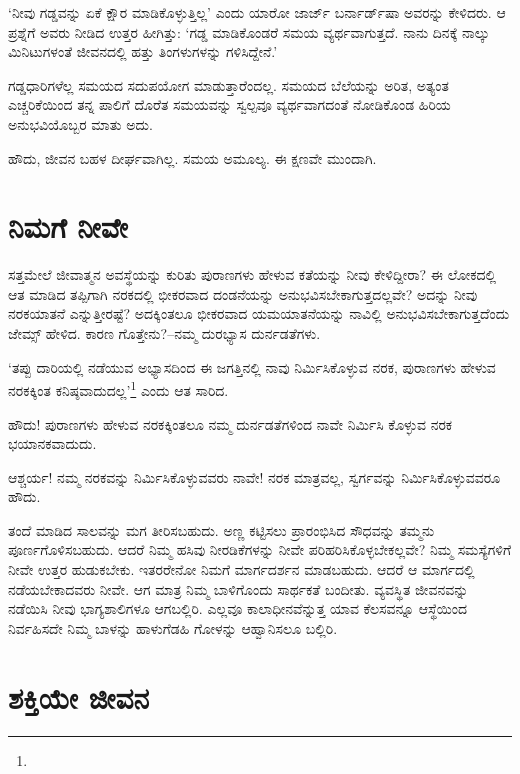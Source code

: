 ‘ನೀವು ಗಡ್ಡವನ್ನು ಏಕೆ ಕ್ಷೌರ ಮಾಡಿಕೊಳ್ಳುತ್ತಿಲ್ಲ’ ಎಂದು ಯಾರೋ ಜಾರ್ಜ್ ಬರ್ನಾರ್ಡ್‍ಷಾ ಅವರನ್ನು ಕೇಳಿದರು. ಆ ಪ್ರಶ್ನೆಗೆ ಅವರು ನೀಡಿದ ಉತ್ತರ ಹೀಗಿತ್ತು: ‘ಗಡ್ಡ ಮಾಡಿಕೊಂಡರೆ ಸಮಯ ವ್ಯರ್ಥವಾಗುತ್ತದೆ. ನಾನು ದಿನಕ್ಕೆ ನಾಲ್ಕು ಮಿನಿಟುಗಳಂತೆ ಜೀವನದಲ್ಲಿ ಹತ್ತು ತಿಂಗಳುಗಳನ್ನು ಗಳಿಸಿದ್ದೇನೆ.’

ಗಡ್ಡಧಾರಿಗಳೆಲ್ಲ ಸಮಯದ ಸದುಪಯೋಗ ಮಾಡುತ್ತಾರೆಂದಲ್ಲ. ಸಮಯದ ಬೆಲೆಯನ್ನು ಅರಿತ, ಅತ್ಯಂತ ಎಚ್ಚರಿಕೆಯಿಂದ ತನ್ನ ಪಾಲಿಗೆ ದೊರೆತ ಸಮಯವನ್ನು ಸ್ವಲ್ಪವೂ ವ್ಯರ್ಥವಾಗದಂತೆ ನೋಡಿಕೊಂಡ ಹಿರಿಯ ಅನುಭವಿಯೊಬ್ಬರ ಮಾತು ಅದು.

ಹೌದು, ಜೀವನ ಬಹಳ ದೀರ್ಘವಾಗಿಲ್ಲ. ಸಮಯ ಅಮೂಲ್ಯ. ಈ ಕ್ಷಣವೇ ಮುಂದಾಗಿ.


\section*{ನಿಮಗೆ ನೀವೇ}


ಸತ್ತಮೇಲೆ ಜೀವಾತ್ಮನ ಅವಸ್ಥೆಯನ್ನು ಕುರಿತು ಪುರಾಣಗಳು ಹೇಳುವ ಕತೆಯನ್ನು ನೀವು ಕೇಳಿ\-ದ್ದೀರಾ? ಈ ಲೋಕದಲ್ಲಿ ಆತ ಮಾಡಿದ ತಪ್ಪಿಗಾಗಿ ನರಕದಲ್ಲಿ ಭೀಕರವಾದ ದಂಡನೆಯನ್ನು ಅನುಭವಿಸಬೇಕಾಗುತ್ತದಲ್ಲವೇ? ಅದನ್ನು ನೀವು ನರಕಯಾತನೆ ಎನ್ನುತ್ತೀರಷ್ಟೆ? ಅದಕ್ಕಿಂತಲೂ ಭೀಕರವಾದ ಯಮಯಾತನೆಯನ್ನು ನಾವಿಲ್ಲಿ ಅನುಭವಿಸಬೇಕಾಗುತ್ತದೆಂದು ಜೇಮ್ಸ್​ ಹೇಳಿದ. ಕಾರಣ ಗೊತ್ತೇನು?–ನಮ್ಮ ದುರಭ್ಯಾಸ ದುರ್ನಡತೆಗಳು.

‘ತಪ್ಪು ದಾರಿಯಲ್ಲಿ ನಡೆಯುವ ಅಭ್ಯಾಸದಿಂದ ಈ ಜಗತ್ತಿನಲ್ಲಿ ನಾವು ನಿರ್ಮಿಸಿಕೊಳ್ಳುವ ನರಕ, ಪುರಾಣಗಳು ಹೇಳುವ ನರಕಕ್ಕಿಂತ ಕನಿಷ್ಠವಾದುದಲ್ಲ’\footnote{\hfill\hbox{}} ಎಂದು ಆತ ಸಾರಿದ.

ಹೌದು! ಪುರಾಣಗಳು ಹೇಳುವ ನರಕಕ್ಕಿಂತಲೂ ನಮ್ಮ ದುರ್ನಡತೆಗಳಿಂದ ನಾವೇ ನಿರ್ಮಿಸಿ ಕೊಳ್ಳುವ ನರಕ ಭಯಾನಕವಾದುದು.

ಆಶ್ಚರ್ಯ! ನಮ್ಮ ನರಕವನ್ನು ನಿರ್ಮಿಸಿಕೊಳ್ಳುವವರು ನಾವೇ! ನರಕ ಮಾತ್ರವಲ್ಲ, ಸ್ವರ್ಗವನ್ನು ನಿರ್ಮಿಸಿಕೊಳ್ಳುವವರೂ ಹೌದು.

ತಂದೆ ಮಾಡಿದ ಸಾಲವನ್ನು ಮಗ ತೀರಿಸಬಹುದು. ಅಣ್ಣ ಕಟ್ಟಿಸಲು ಪ್ರಾರಂಭಿಸಿದ ಸೌಧವನ್ನು ತಮ್ಮನು ಪೂರ್ಣಗೊಳಿಸಬಹುದು. ಆದರೆ ನಿಮ್ಮ ಹಸಿವು ನೀರಡಿಕೆಗಳನ್ನು ನೀವೇ ಪರಿಹರಿಸಿಕೊಳ್ಳಬೇಕಲ್ಲವೇ? ನಿಮ್ಮ ಸಮಸ್ಯೆಗಳಿಗೆ ನೀವೇ ಉತ್ತರ ಹುಡುಕಬೇಕು. ಇತರರೇನೋ ನಿಮಗೆ ಮಾರ್ಗದರ್ಶನ ಮಾಡಬಹುದು. ಆದರೆ ಆ ಮಾರ್ಗದಲ್ಲಿ ನಡೆಯಬೇಕಾದವರು ನೀವೇ. ಆಗ ಮಾತ್ರ ನಿಮ್ಮ ಬಾಳಿಗೊಂದು ಸಾರ್ಥಕತೆ ಬಂದೀತು. ವ್ಯವಸ್ಥಿತ ಜೀವನವನ್ನು ನಡೆಯಿಸಿ ನೀವು ಭಾಗ್ಯಶಾಲಿಗಳೂ ಆಗಬಲ್ಲಿರಿ. ಎಲ್ಲವೂ ಕಾಲಾಧೀನವೆನ್ನುತ್ತ ಯಾವ ಕೆಲಸವನ್ನೂ ಆಸ್ಥೆಯಿಂದ ನಿರ್ವಹಿಸದೇ ನಿಮ್ಮ ಬಾಳನ್ನು ಹಾಳುಗೆಡಹಿ ಗೋಳನ್ನು ಆಹ್ವಾನಿಸಲೂ ಬಲ್ಲಿರಿ.


\section*{ಶಕ್ತಿಯೇ ಜೀವನ}

